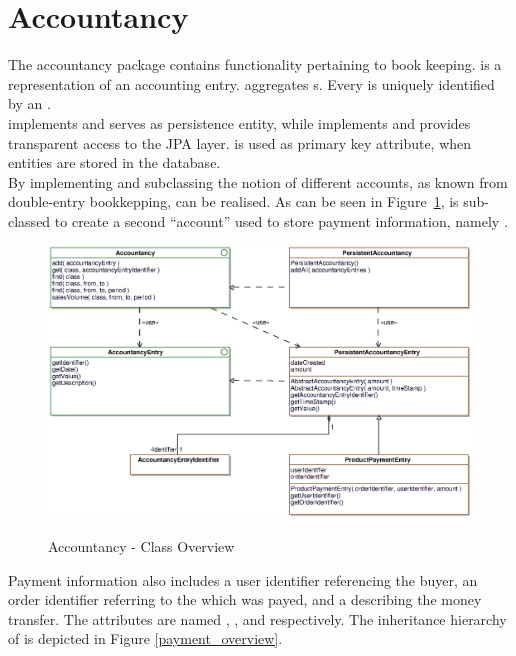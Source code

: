 \section{Accountancy}
\label{sec:accountancy}

The accountancy package contains functionality pertaining to book keeping.
 is a representation of an accounting entry.
 aggregates s.
Every  is uniquely identified by an .
\\

 implements  and serves as persistence entity, while  implements  and provides transparent access to the JPA layer.
 is used as primary key attribute, when entities are stored in the database.
\\

By implementing and subclassing  the notion of different accounts, as known from double-entry bookkepping, can be realised.
As can be seen in Figure~\ref{accountancy_overview},  is sub-classed to create a second ``account'' used to store payment information, namely .
\begin{figure}
	\centering
  \includegraphics[width=1.0\textwidth]{images/Accountancy_Overview.eps}
	\label{accountancy_overview}
	\caption{Accountancy - Class Overview}
\end{figure}

Payment information also includes a user identifier referencing the buyer, an order identifier referring to the  which was payed, and a  describing the money transfer.
The attributes are named , , and  respectively.
The inheritance hierarchy of  is depicted in Figure \ref{payment_overview}.

